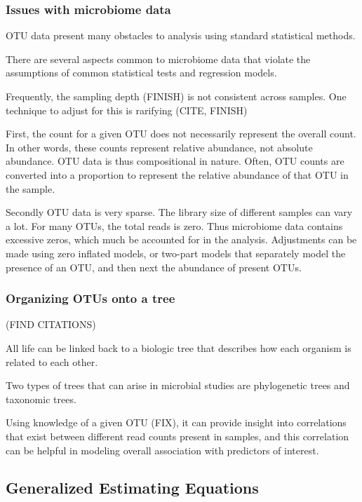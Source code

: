 \documentclass[12pt]{article}
\begin{document}
\subsubsection{Issues with microbiome data}

 OTU data present many obstacles to analysis using standard statistical methods.

 There are several aspects common to microbiome data that violate the assumptions of common statistical tests and regression models.

Frequently, the sampling depth (FINISH) is not consistent across samples. One technique to adjust for this is rarifying (CITE, FINISH)

First, the count for a given OTU does not necessarily represent the overall count. In other words, these counts represent relative abundance, not absolute abundance. OTU data is thus compositional in nature. Often, OTU counts are converted into a proportion to represent the relative abundance of that OTU in the sample.

Secondly OTU data is very sparse. The library size of different samples can vary a lot. For many OTUs, the total reads is zero. Thus microbiome data contains excessive zeros, which much be accounted for in the analysis.
Adjustments can be made using zero inflated models, or two-part models that separately model the presence of an OTU, and then next the abundance of present OTUs.




\subsubsection{Organizing OTUs onto a tree}

(FIND CITATIONS)

All life can be linked back to a biologic tree that describes how each organism is related to each other.

Two types of trees that can arise in microbial studies are phylogenetic trees and taxonomic trees.

Using knowledge of a given OTU (FIX), it can provide insight into correlations that exist between different read counts present in samples, and this correlation can be helpful in modeling overall association with predictors of interest.




\subsection{Generalized Estimating Equations}
\end{document}
